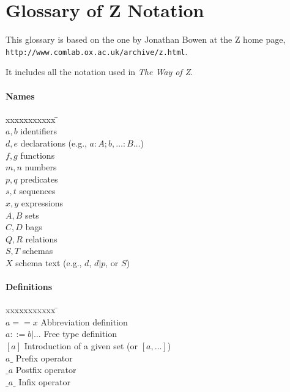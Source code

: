 
\section*{Glossary of Z Notation} \label{app:gloss}

This glossary is based on the one by Jonathan Bowen at the Z home page, \\
{\tt http://www.comlab.ox.ac.uk/archive/z.html}.  

It includes all the notation used in {\em The Way of Z}.

\paragraph{Names}

\begin{tabbing}
xxxxxxxxxxx \= \kill \\ 
$a,b$ \> identifiers \\
$d,e$ \> declarations (e.g., $a: A; b, \dots: B \dots$) \\
$f,g$ \> functions \\
$m,n$ \> numbers \\
$p,q$ \> predicates \\
$s,t$ \> sequences \\
$x,y$ \> expressions \\
$A,B$ \> sets \\
$C,D$ \> bags \\
$Q,R$ \> relations \\
$S,T$ \> schemas \\
$X$ \> schema text (e.g., $d$, $d | p$, or $S$) \\
\end{tabbing}

\paragraph{Definitions}

\begin{tabbing}
xxxxxxxxxxx \= \kill \\ 
$a == x$ \>  Abbreviation definition \\
$a ::= b | \dots$ \> Free type definition \\
$[a]$ \> Introduction of a given set (or $[a,\dots]$) \\
$a \_$ \> Prefix operator \\
$\_ a$ \> Postfix operator \\
$\_ a \_$ \> Infix operator \\
\end{tabbing}

